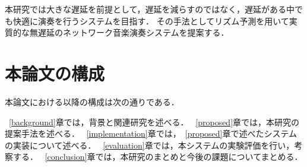 本研究では大きな遅延を前提として，遅延を減らすのではなく，遅延がある中でも快適に演奏を行うシステムを目指す．
その手法としてリズム予測を用いて実質的な無遅延のネットワーク音楽演奏システムを提案する．


\section{本論文の構成}

本論文における以降の構成は次の通りである．

~\ref{background}章では，背景と関連研究を述べる．
~\ref{proposed}章では，本研究の提案手法を述べる．
~\ref{implementation}章では，~\ref{proposed}章で述べたシステムの実装について述べる．
~\ref{evaluation}章では，本システムの実験評価を行い，考察する．
~\ref{conclusion}章では，本研究のまとめと今後の課題についてまとめる．


